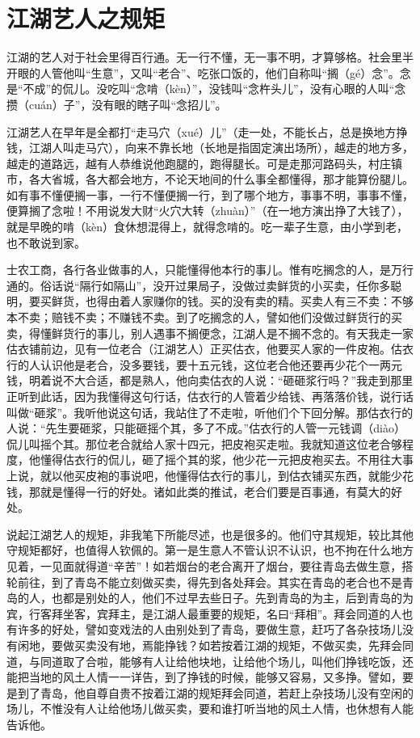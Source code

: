 \documentclass[12pt,UTF8]{ctexbook}
\begin{document}
\section{江湖艺人之规矩}


江湖的艺人对于社会里得百行通。无一行不懂，无一事不明，才算够格。社会里半开眼的人管他叫“生意”，又叫“老合”、吃张口饭的，他们自称叫“搁（gé）念”。念是“不成”的侃儿。没吃叫“念啃（kèn）”，没钱叫“念杵头儿”，没有心眼的人叫“念攒（cuán）子”，没有眼的瞎子叫“念招儿”。

江湖艺人在早年是全都打“走马穴（xué）儿”（走一处，不能长占，总是换地方挣钱，江湖人叫走马穴），向来不靠长地（长地是指固定演出场所），越走的地方多，越走的道路远，越有人恭维说他跑腿的，跑得腿长。可是走那河路码头，村庄镇市，各大省城，各大都会地方，不论天地间的什么事全都懂得，那才能算份腿儿。如有事不懂便搁一事，一行不懂便搁一行，到了哪个地方，事事不明，事事不懂，便算搁了念啦！不用说发大财“火穴大转（zhuàn）”（在一地方演出挣了大钱了），就是早晚的啃（kèn）食休想混得上，就得念啃的。吃一辈子生意，由小学到老，也不敢说到家。

士农工商，各行各业做事的人，只能懂得他本行的事儿。惟有吃搁念的人，是万行通的。俗话说“隔行如隔山”，没开过果局子，没做过卖鲜货的小买卖，任你多聪明，要买鲜货，也得由着人家赚你的钱。买的没有卖的精。买卖人有三不卖：不够本不卖；赔钱不卖；不赚钱不卖。到了吃搁念的人，譬如他们没做过鲜货行的买卖，得懂鲜货行的事儿，别人遇事不搁便念，江湖人是不搁不念的。有天我走一家估衣铺前边，见有一位老合（江湖艺人）正买估衣，他要买人家的一件皮袍。估衣行的人认识他是老合，没多要钱，要十五元钱，这位老合他还要再少花个一两元钱，明着说不大合适，都是熟人，他向卖估衣的人说：“砸砸浆行吗？”我走到那里正听到此话，因为我懂得这句行话，估衣行的人管着少给钱、再落落价钱，说行话叫做“砸浆”。我听他说这句话，我站住了不走啦，听他们个下回分解。那估衣行的人说：“先生要砸浆，只能砸摇个其，多了不成。”估衣行的人管一元钱调（diào）侃儿叫摇个其。那位老合就给人家十四元，把皮袍买走啦。我就知道这位老合够程度，他懂得估衣行的侃儿，砸了摇个其的浆，他少花一元把皮袍买去。不用往大事上说，就以他买皮袍的事说吧，他懂得估衣行的事儿，到估衣铺买东西，就能少花钱，那就是懂得一行的好处。诸如此类的推试，老合们要是百事通，有莫大的好处。

说起江湖艺人的规矩，非我笔下所能尽述，也是很多的。他们守其规矩，较比其他守规矩都好，也值得人钦佩的。第一是生意人不管认识不认识，也不拘在什么地方见着，一见面就得道“辛苦”！如若烟台的老合离开了烟台，要往青岛去做生意，搭轮前往，到了青岛不能立刻做买卖，得先到各处拜会。其实在青岛的老合也不是青岛的人，也都是别处的人，他们不过早去些日子。先到青岛的为主，后到青岛的为宾，行客拜坐客，宾拜主，是江湖人最重要的规矩，名曰“拜相”。拜会同道的人也有许多的好处，譬如变戏法的人由别处到了青岛，要做生意，赶巧了各杂技场儿没有闲地，要做买卖没有地，焉能挣钱？如若按着江湖的规矩，不做买卖，先拜会同道，与同道取了合啦，能够有人让给他块地，让给他个场儿，叫他们挣钱吃饭，还能把当地的风土人情一一详告，到了挣钱的时候，能够又容易，又多挣。譬如，要是到了青岛，他自尊自贵不按着江湖的规矩拜会同道，若赶上杂技场儿没有空闲的场儿，不惟没有人让给他场儿做买卖，要和谁打听当地的风土人情，也休想有人能告诉他。
\end{document}

